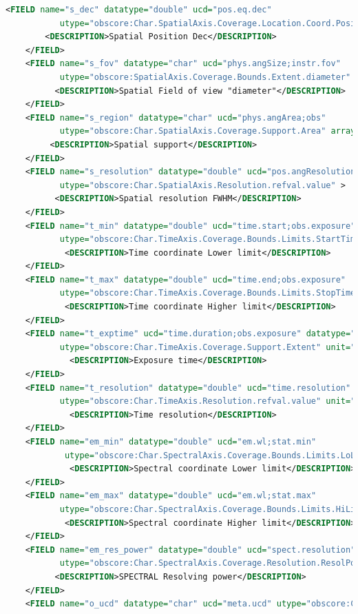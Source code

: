 \documentclass[11pt,a4paper]{ivoa}
\begin{document}
\begin{lstlisting}[basicstyle=\scriptsize,language=XML]
    <FIELD name="s_dec" datatype="double" ucd="pos.eq.dec"
           utype="obscore:Char.SpatialAxis.Coverage.Location.Coord.Position2D.Value2.C2" unit="deg" > 
        <DESCRIPTION>Spatial Position Dec</DESCRIPTION> 
    </FIELD> 
    <FIELD name="s_fov" datatype="char" ucd="phys.angSize;instr.fov"
           utype="obscore:SpatialAxis.Coverage.Bounds.Extent.diameter" unit="deg" > 
          <DESCRIPTION>Spatial Field of view "diameter"</DESCRIPTION>
    </FIELD> 
    <FIELD name="s_region" datatype="char" ucd="phys.angArea;obs"
           utype="obscore:Char.SpatialAxis.Coverage.Support.Area" arraysize="*" unit="deg" > 
         <DESCRIPTION>Spatial support</DESCRIPTION>       
    </FIELD> 
    <FIELD name="s_resolution" datatype="double" ucd="pos.angResolution"
           utype="obscore:Char.SpatialAxis.Resolution.refval.value" > 
          <DESCRIPTION>Spatial resolution FWHM</DESCRIPTION>  
    </FIELD> 
    <FIELD name="t_min" datatype="double" ucd="time.start;obs.exposure"
           utype="obscore:Char.TimeAxis.Coverage.Bounds.Limits.StartTime" unit="s" > 
            <DESCRIPTION>Time coordinate Lower limit</DESCRIPTION>
    </FIELD> 
    <FIELD name="t_max" datatype="double" ucd="time.end;obs.exposure"
           utype="obscore:Char.TimeAxis.Coverage.Bounds.Limits.StopTime" unit="s"> 
            <DESCRIPTION>Time coordinate Higher limit</DESCRIPTION>
    </FIELD> 
    <FIELD name="t_exptime" ucd="time.duration;obs.exposure" datatype="double"
           utype="obscore:Char.TimeAxis.Coverage.Support.Extent" unit="s" > 
             <DESCRIPTION>Exposure time</DESCRIPTION>
    </FIELD> 
    <FIELD name="t_resolution" datatype="double" ucd="time.resolution"
           utype="obscore:Char.TimeAxis.Resolution.refval.value" unit="s" > 
             <DESCRIPTION>Time resolution</DESCRIPTION>
    </FIELD> 
    <FIELD name="em_min" datatype="double" ucd="em.wl;stat.min"
            utype="obscore:Char.SpectralAxis.Coverage.Bounds.Limits.LoLimit" unit="m" > 
             <DESCRIPTION>Spectral coordinate Lower limit</DESCRIPTION>
    </FIELD> 
    <FIELD name="em_max" datatype="double" ucd="em.wl;stat.max"
           utype="obscore:Char.SpectralAxis.Coverage.Bounds.Limits.HiLimit"  unit="m"> 
            <DESCRIPTION>Spectral coordinate Higher limit</DESCRIPTION>
    </FIELD> 
    <FIELD name="em_res_power" datatype="double" ucd="spect.resolution"
           utype="obscore:Char.SpectralAxis.Coverage.Resolution.ResolPower.refval" > 
          <DESCRIPTION>SPECTRAL Resolving power</DESCRIPTION>
    </FIELD> 
    <FIELD name="o_ucd" datatype="char" ucd="meta.ucd" utype="obscore:Char.ObservableAxis.ucd" arraysize="*" > 

\end{lstlisting}
\end{document}
